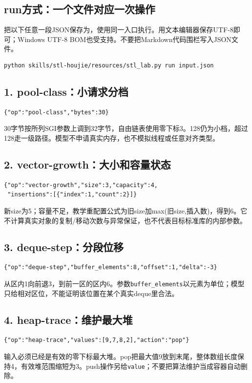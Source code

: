 \documentclass[11pt,a4paper,fontset=fandol]{ctexart}
\begin{document}
\subsection{run方式：一个文件对应一次操作}
把以下任意一段JSON保存为，使用同一入口执行。用文本编辑器保存UTF-8即可；Windows UTF-8 BOM也受支持。不要把Markdown代码围栏写入JSON文件。
\begin{lstlisting}
python skills/stl-houjie/resources/stl_lab.py run input.json
\end{lstlisting}

\subsection{1. pool-class：小请求分档}
\begin{lstlisting}
{"op":"pool-class","bytes":30}
\end{lstlisting}
30字节按所列SGI参数上调到32字节，自由链表使用零下标3。128仍为小档，超过128走一级路径。模型不申请真实内存，也不模拟线程或任意对齐类型。

\subsection{2. vector-growth：大小和容量状态}
\begin{lstlisting}
{"op":"vector-growth","size":3,"capacity":4,
 "insertions":[{"index":1,"count":2}]}
\end{lstlisting}
新size为5；容量不足，教学重配置公式为旧size加max(旧size,插入数)，得到6。它不计算真实对象的复制/移动次数与异常保证，也不代表目标标准库的内部参数。

\subsection{3. deque-step：分段位移}
\begin{lstlisting}
{"op":"deque-step","buffer_elements":8,"offset":1,"delta":-3}
\end{lstlisting}
从区内1向前退3，到前一区的区内6。参数\texttt{buffer\_elements}以元素为单位；模型只给相对区位，不能证明该位置在某个真实deque里合法。

\subsection{4. heap-trace：维护最大堆}
\begin{lstlisting}
{"op":"heap-trace","values":[9,7,8,2],"action":"pop"}
\end{lstlisting}
输入必须已经是有效的零下标最大堆。pop把最大值9放到末尾，整体数组长度保持4，有效堆范围缩短为3。push操作另给\texttt{value}；不要把算法维护当成容器自动删除。
\end{document}
